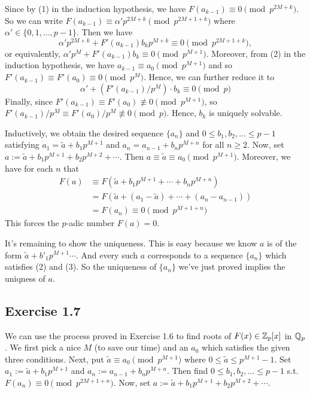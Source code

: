 \documentclass[../Koblitz.tex]{subfiles}
\begin{document}
Since by (1) in the induction hypothesis, we have $F(a_{k-1})\equiv 0 \pmod{p^{2M+k}}$. So we can write $F(a_{k-1}) \equiv \alpha'p^{2M+k} \pmod{p^{2M+1+k}}$ where
$\alpha'\in\{0,1,\ldots,p-1\}$. Then we have $$\alpha'p^{2M+k}+F'(a_{k-1})b_kp^{M+k} \equiv 0\pmod{p^{2M+1+k}},$$ or equivalently, $\alpha'p^M+F'(a_{k-1})b_k \equiv0 \pmod{p^{M+1}}$. Moreover, from (2) in the induction hypothesis, we have $a_{k-1}\equiv a_0 \pmod{p^{M+1}}$ and so $F'(a_{k-1})\equiv F'(a_0)\equiv 0 \pmod{p^M}$. Hence, we can further reduce it to $$\alpha'+(F'(a_{k-1})/p^M)\cdot b_k \equiv 0\pmod{p}$$ Finally, since $F'(a_{k-1})\equiv F'(a_0)\not\equiv 0 \pmod{p^{M+1}}$, so $F'(a_{k-1})/p^M \equiv F'(a_0)/p^M\not\equiv 0 \pmod{p}$. Hence, $b_k$ is uniquely solvable.

Inductively, we obtain the desired sequence $\{a_n\}$ and $0\leq b_1,b_2,\ldots \leq p-1$ satisfying $a_1=\tilde{a}+b_1p^{M+1}$ and $a_n=a_{n-1}+b_np^{M+n}$ for all $n\geq2$. Now, set $a:=\tilde{a}+b_1p^{M+1}+b_2p^{M+2}+\cdots$. Then $a\equiv \tilde{a} \equiv a_0\pmod{p^{M+1}}$. Moreover, we have for each $n$ that
\begin{align*}
    F(a) &\equiv F(\tilde{a}+b_1p^{M+1}+\cdots+b_np^{M+n}) \\
    &= F(\tilde{a}+(a_1-\tilde{a})+\cdots+(a_n-a_{n-1})) \\
    &= F(a_n) \equiv 0 \pmod{p^{M+1+n}}
\end{align*}
This forces the $p$-adic number $F(a)=0$.

It's remaining to show the uniqueness. This is easy because we know $a$ is of the form $\tilde{a}+b'_1p^{M+1}\cdots$. And every such $a$ corresponds to a sequence $\{a_n\}$ which satisfies (2) and (3). So the uniqueness of $\{a_n\}$ we've just proved implies the uniqness of $a$.

\subsection*{Exercise 1.7}

We can use the process proved in Exercise 1.6 to find roots of $F(x)\in\mathbb{Z}_p[x]$ in $\mathbb{Q}_p$. We first pick a nice $M$ (to save our time) and an $a_0$ which satisfies the given three conditions. Next, put $\tilde{a}\equiv a_0 \pmod{p^{M+1}}$ where $0\leq \tilde{a} \leq p^{M+1}-1$. Set $a_1:=\tilde{a}+b_1p^{M+1}$ and $a_n:=a_{n-1}+b_np^{M+n}$. Then find $0\leq b_1,b_2,\ldots \leq p-1$ s.t. $F(a_n)\equiv 0\pmod{p^{2M+1+n}}$. Now, set $a:=\tilde{a}+b_1p^{M+1}+b_2p^{M+2}+\cdots$.
\end{document}
